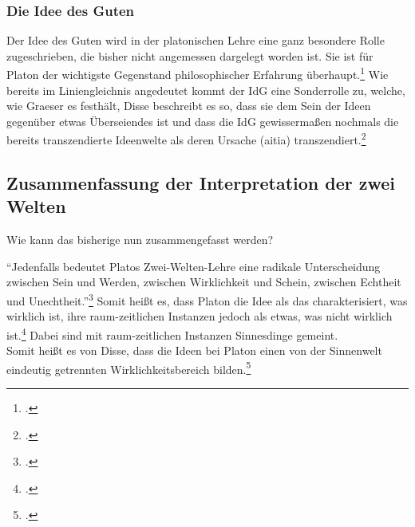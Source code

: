 \subsubsection{Die Idee des Guten}
Der Idee des Guten wird in der platonischen Lehre eine ganz besondere Rolle zugeschrieben, die bisher nicht angemessen dargelegt worden ist. Sie ist  für Platon der wichtigste Gegenstand philosophischer Erfahrung überhaupt.\footcite[vgl.][S. 158]{GraeserPhiloGeschichte}
Wie bereits im Liniengleichnis angedeutet kommt der IdG eine Sonderrolle zu, welche, wie Graeser es festhält, 
Disse beschreibt es so, dass sie dem Sein der Ideen gegenüber etwas Überseiendes ist und dass die IdG gewissermaßen nochmals die bereits transzendierte Ideenwelte als deren Ursache (aitia) transzendiert.\footcite[vgl.][S. 50]{DisseMetaphysik}

\subsection{Zusammenfassung der Interpretation der zwei Welten}
Wie kann das bisherige nun zusammengefasst werden?

\enquote{Jedenfalls bedeutet Platos Zwei-Welten-Lehre eine radikale Unterscheidung zwischen Sein und Werden, zwischen Wirklichkeit und Schein, zwischen Echtheit und Unechtheit.}\footcite[][S. 134]{GraeserPhiloGeschichte}
Somit heißt es, dass Platon die Idee als das charakterisiert, was wirklich ist, ihre raum-zeitlichen Instanzen jedoch als etwas, was nicht wirklich ist.\footcite[vgl.][S. 139]{GraeserPhiloGeschichte} Dabei sind mit raum-zeitlichen Instanzen Sinnesdinge gemeint.\\
Somit heißt es von Disse, dass die Ideen bei Platon einen von der Sinnenwelt eindeutig getrennten Wirklichkeitsbereich bilden.\footcite[][S. 31]{DisseMetaphysik}

